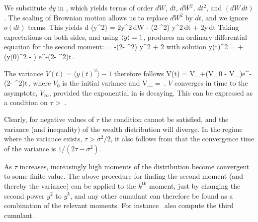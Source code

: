 We substitute $dy$ in , which yields terms of order $dW$, $dt$, $dW^2$, $dt^2$, and $\left(dW\,dt\right)$. The scaling of Brownian motion allows us to replace $dW^2$ by $dt$, and we ignore $o\left(dt\right)$ terms. This yields
\bea
d \left(y^2\right) = 2\sigma y^2\,dW - \left(2\tau-\sigma^2\right) y^2\,dt + 2\tau y\,dt %
\eea
Taking expectations on both sides, and using $\left\langle y \right\rangle=1$, produces an ordinary differential equation for the second moment:
\be
{} = -\left(2\tau - \sigma^2\right) \langle y^2 \rangle + 2\tau
{}
\ee
with solution
\be
\langle y\left(t\right)^2 \rangle =  + \left(\langle y\left(0\right)^2 \rangle - \right) e^{-\left(2\tau - \sigma^2\right)t}\,.
\ee

The variance $V\left(t\right)=\langle y\left(t\right)^2 \rangle-1$ therefore follows
\be
V\left(t\right) = V_{\infty}+\left(V_0 - V_{\infty}\right)e^{-\left(2\tau - \sigma^2\right)t}\,,
\ee
where $V_0$ is the initial variance and
\be
V_{\infty} = \,.
\ee
$V$ converges in time to the asymptote, $V_{\infty}$, provided the exponential in  is decaying. 
This can be expressed as a condition on $\tau$
\be
\tau >  \,.
\ee

Clearly, for negative values of $\tau$ the condition cannot be satisfied, and the variance (and inequality) of the wealth distribution will diverge. 
In the regime where the variance exists, $\tau > \sigma^2/2$, it also follows from  that the convergence time of the variance is $1/\left(2\tau - \sigma^2\right)$.

As $\tau$ increases, increasingly high moments of the distribution become convergent to some finite value. 
The above procedure for finding the second moment (and thereby the variance) can be applied to the $k^\text{th}$ moment, just by changing the second power $y^2$ to $y^k$, and any other cumulant can therefore be found as a combination of the relevant moments. 
For instance~\cite{LiuSerota2016} also compute the third cumulant.
